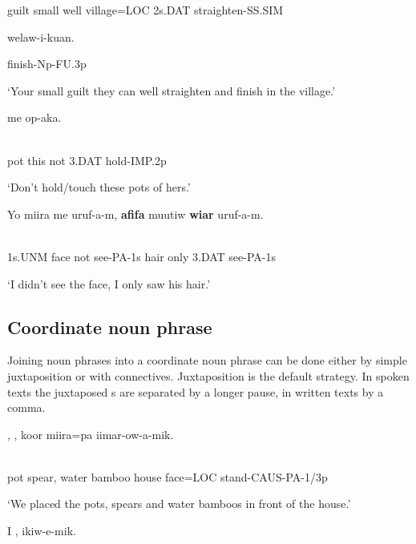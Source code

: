 guilt  small  well  village=LOC  2s.DAT  straighten-SS.SIM  

welaw-i-kuan.

finish-Np-FU.3p

`Your small guilt they can well straighten and finish in the village.'

\ea%
\label{ex:x1812}
\gll {}  me    op-aka. \\
      \\
\glt
\z

pot  this  not  3.DAT  hold-IMP.2p

`Don't hold/touch these pots of hers.'

\ea%
\label{ex:x1938}
\gll Yo  miira  me  uruf-a-m,  \textbf{afifa}  muutiw  \textbf{wiar}  uruf-a-m. \\
      \\
\glt
\z

1s.UNM  face  not  see-PA-1s  hair  only  3.DAT  see-PA-1s

`I didn't see the face, I only saw his hair.'

\subsection{Coordinate noun phrase}
{}
Joining noun phrases into a coordinate noun phrase can be done either by simple juxtaposition or with connectives. Juxtaposition is the default strategy.  In spoken texts the juxtaposed s are separated by a longer pause, in written texts by a comma.

\ea%
\label{ex:x810}
\gll {},  ,    koor  miira=pa  iimar-ow-a-mik. \\
      \\
\glt
\z

pot  spear,  water  bamboo  house  face=LOC  stand-CAUS-PA-1/3p

`We placed the pots, spears and water bamboos in front of the house.'

\ea%
\label{ex:x811}
\gll I  ,    ikiw-e-mik. \\
      \\
\glt
\z

